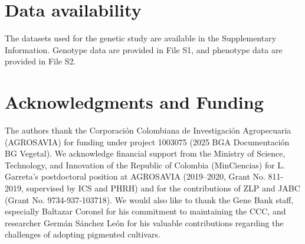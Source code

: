 \documentclass[pdflatex,sn-mathphys-ay]{sn-jnl}%
\begin{document}





\section{Data availability}

The datasets used for the genetic study are available in the Supplementary Information. Genotype data are provided in File S1, and phenotype data are provided in File S2.

\section{Acknowledgments and Funding}

The authors thank the Corporación Colombiana de Investigación Agropecuaria (AGROSAVIA) for funding under project 1003075 (2025 BGA Documentación BG Vegetal). We acknowledge financial support from the Ministry of Science, Technology, and Innovation of the Republic of Colombia (MinCiencias) for L. Garreta's postdoctoral position at AGROSAVIA (2019–2020, Grant No. 811-2019, supervised by ICS and PHRH) and for the contributions of ZLP and JABC (Grant No. 9734-937-103718). We would also like to thank the Gene Bank staff, especially Baltazar Coronel for his commitment to maintaining the CCC, and researcher Germán Sánchez León for his valuable contributions regarding the challenges of adopting pigmented cultivars.
\end{document}
